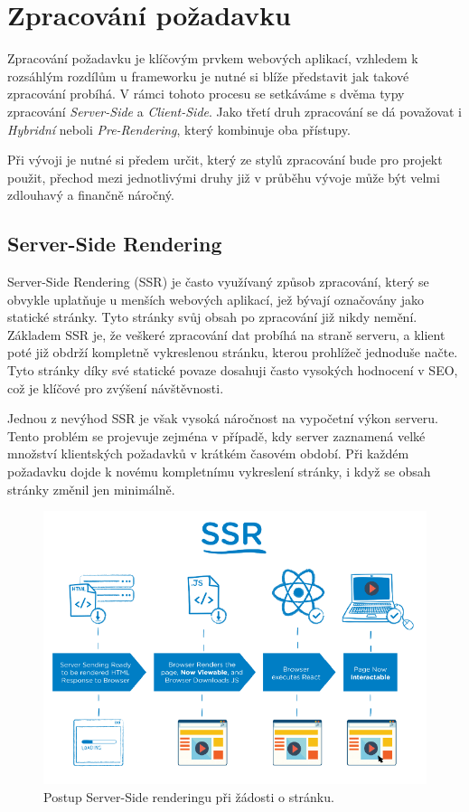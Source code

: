 \section{Zpracování požadavku}
\label{sec:dev-request-processing}
Zpracování požadavku je klíčovým prvkem webových aplikací, vzhledem k rozsáhlým rozdílům u frameworku je nutné si blíže představit jak takové zpracování probíhá. V rámci tohoto procesu se setkáváme s dvěma typy zpracování \textit{Server-Side} a \textit{Client-Side}. Jako třetí druh zpracování se dá považovat i \textit{Hybridní} neboli \textit{Pre-Rendering}, který kombinuje oba přístupy.

Při vývoji je nutné si předem určit, který ze stylů zpracování bude pro projekt použit, přechod mezi jednotlivými druhy již v průběhu vývoje může být velmi zdlouhavý a finančně náročný. \cite{request_processing}

\subsection{Server-Side Rendering}
\label{subsec:dev-request-processing-server-side-rendering}
Server-Side Rendering (SSR) je často využívaný způsob zpracování, který se obvykle uplatňuje u menších webových aplikací, jež bývají označovány jako statické stránky. Tyto stránky svůj obsah po zpracování již nikdy nemění. Základem SSR je, že veškeré zpracování dat probíhá na straně serveru, a klient poté již obdrží kompletně vykreslenou stránku, kterou prohlížeč jednoduše načte. Tyto stránky díky své statické povaze dosahuji často vysokých hodnocení v SEO, což je klíčové pro zvýšení návštěvnosti.

Jednou z nevýhod SSR je však vysoká náročnost na vypočetní výkon serveru. Tento problém se projevuje zejména v případě, kdy server zaznamená velké množství klientských požadavků v krátkém časovém období. Při každém požadavku dojde k novému kompletnímu vykreslení stránky, i když se obsah stránky změnil jen minimálně.

\begin{figure}[H]
    \centering
    \includegraphics[width=1.0\textwidth]{figures/server-side-rendering}
    \caption{Postup Server-Side renderingu při žádosti o stránku. \cite{rendering-diff}}
    \label{fig:server-side-rendering}
\end{figure}

